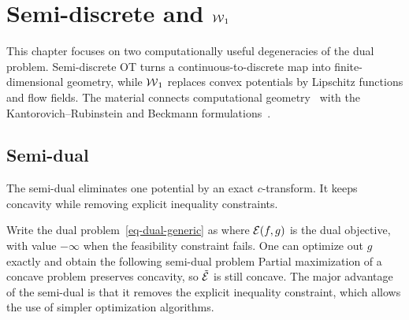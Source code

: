 
\chapter[Semi-discrete and W1]{Semi-discrete and $\operatorname{\mathcal{W}}_1$}
\label{sec-semidiscr-w1}

This chapter focuses on two computationally useful degeneracies of the dual problem. Semi-discrete OT turns a continuous-to-discrete map into finite-dimensional geometry, while $\operatorname{\mathcal{W}}_1$ replaces convex potentials by Lipschitz functions and flow fields. The material connects computational geometry~\cite{AurenhammerHA98,Merigot11,merigot2013comparison} with the Kantorovich--Rubinstein and Beckmann formulations~\cite{kantorovich1958space,Beckmann52}.

\section{Semi-dual}

The semi-dual eliminates one potential by an exact $c$-transform. It keeps concavity while removing explicit inequality constraints.

Write the dual problem~\eqref{eq-dual-generic} as
where $\mathcal{E}(f,g)$ is the dual objective, with value $-\infty$ when the feasibility constraint fails. One can optimize out $g$ exactly and obtain the following semi-dual problem
Partial maximization of a concave problem preserves concavity, so $\tilde {\mathcal{E}}$ is still concave. The major advantage of the semi-dual is that it removes the explicit inequality constraint, which allows the use of simpler optimization algorithms.


